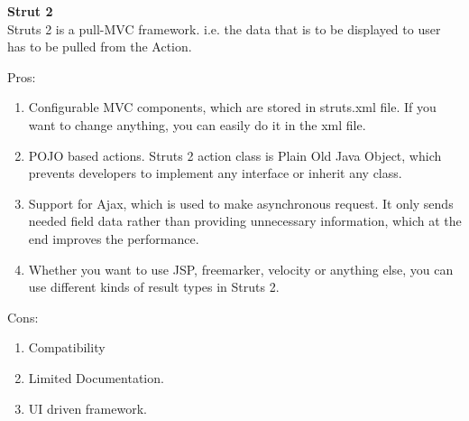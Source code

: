 		\textbf{Strut 2} \\
		Struts 2 is a pull-MVC framework. i.e. the data that is to be displayed to user has to be pulled from the Action.
		
		Pros:
		\begin{enumerate}
			\item Configurable MVC components, which are stored in struts.xml file. If you want to change anything, you can easily do it in the xml file.
			\item POJO based actions. Struts 2 action class is Plain Old Java Object, which prevents developers to implement any interface or inherit any class.
			\item Support for Ajax, which is used to make asynchronous request. It only sends needed field data rather than providing unnecessary information, which at the end improves the performance.
			\item Whether you want to use JSP, freemarker, velocity or anything else, you can use different kinds of result types in Struts 2.
		\end{enumerate}
		Cons:
		\begin{enumerate}
			\item Compatibility
			\item Limited Documentation.
			\item UI driven framework.
		\end{enumerate}